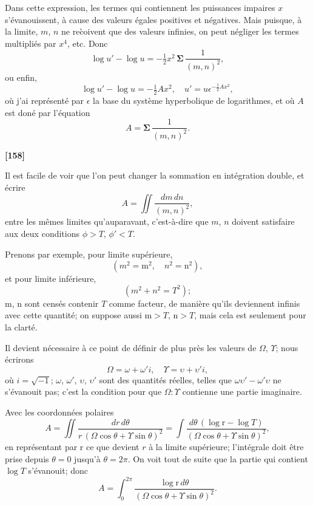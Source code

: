 \documentclass[11pt,a4paper]{book}
\begin{document}
Dans cette expression, les termes qui contiennent les puissances impaires $x$ s'\'evanouissent,
\`a cause des valeurs \'egales positives et n\'egatives. Mais puisque, \`a la limite, $m$, $n$ ne
re\`coivent que des valeurs infinies, on peut n\'egliger les termes multipli\'es par $x^4$, etc.
Donc
\[\log u' - \log u = -\tfrac{1}{2} x^2\, \boldsymbol{\Sigma}\, \frac{1}{(m, n)^2},\]
ou enfin,
\begin{equation}
\log u' - \log u = -\tfrac{1}{2}Ax^2,\quad u' = u\epsilon^{-\frac{1}{2}Ax^2}, \tag{3}
\end{equation}
o\`u j'ai repr\'esent\'e par $\epsilon$ la base du syst\`eme hyperbolique de logarithmes, et o\`u $A$ est
don\'e par l'\'equation
\begin{equation}
A = \boldsymbol{\Sigma}\, \frac{1}{(m, n)^2}. \tag{4}
\end{equation}

\textbf{[158]}

Il est facile de voir que l'on peut changer la sommation en int\'egration double, et \'ecrire
\begin{equation}
A = \iint \frac{dm\, dn}{(m, n)^2}, \tag{5}
\end{equation}
entre les m\^emes limites qu'auparavant, c'est-\`a-dire que $m$, $n$ doivent satisfaire aux
deux conditions $\phi > T$, $\phi' < T$.

Prenons par exemple, pour limite sup\'erieure,
\[(m^2 = \mathrm{m}^2,\quad n^2 = \mathrm{n}^2),\]
et pour limite inf\'erieure,
\[(m^2 + n^2 = T^2);\]
$\mathrm{m}$, $\mathrm{n}$ sont cens\'es contenir $T$ comme facteur, de mani\`ere qu'ils deviennent infinis avec
cette quantit\'e; on suppose aussi $\mathrm{m} > T$, $\mathrm{n} > T$, mais cela est seulement pour la clart\'e.

Il devient n\'ecessaire \`a ce point de d\'efinir de plus pr\`es les valeurs de $\Omega$, $\Upsilon$; nous
\'ecrirons
\begin{equation}
\Omega = \omega + \omega'i,\quad \Upsilon = \upsilon + \upsilon'i, \tag{6}
\end{equation}
o\`u $i = \sqrt{-1}$; $\omega$, $\omega'$, $\upsilon$, $\upsilon'$ sont des quantit\'es r\'eelles, telles que $\omega\upsilon' - \omega'\upsilon$ ne s'\'evanouit
pas; c'est la condition pour que $\Omega : \Upsilon$ contienne une partie imaginaire.

Avec les coordonn\'ees polaires
\begin{equation}
A = \iint \frac{dr\, d\theta}{r\, (\Omega\cos\theta + \Upsilon\sin\theta)^2}
= \int \frac{d\theta\, (\log \mathrm{r} - \log T)}{(\Omega\cos\theta + \Upsilon\sin\theta)^2}, \tag{7}
\end{equation}
en repr\'esentant par $\mathrm{r}$ ce que devient $r$ \`a la limite sup\'erieure; l'int\'egrale doit \^etre
prise depuis $\theta = 0$ jusqu'\`a $\theta = 2\pi$. On voit tout de suite que la partie qui contient
$\log T$ s'\'evanouit; donc
\[A = \int_0^{2\pi} \frac{\log \mathrm{r}\, d\theta}{(\Omega\cos\theta + \Upsilon\sin\theta)^2}.\]
\end{document}
